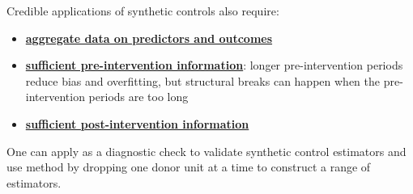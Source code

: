 \documentclass[twoside]{article}
\begin{document}
Credible applications of synthetic controls also require:
\begin{itemize}
    \item \underline{\textbf{aggregate data on predictors and outcomes}}
    \item \underline{\textbf{sufficient pre-intervention information}}: longer pre-intervention periods reduce bias and overfitting, but structural breaks can happen when the pre-intervention periods are too long 
    \item \underline{\textbf{sufficient post-intervention information}}
\end{itemize}
One can apply  as a diagnostic check to validate synthetic control estimators and use  method by dropping one donor unit at a time to construct a range of estimators.
\end{document}
